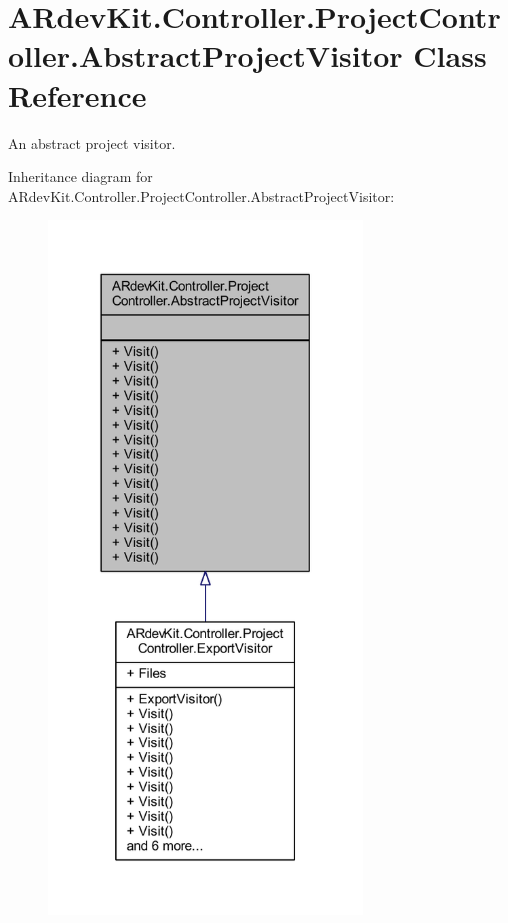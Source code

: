 \hypertarget{class_a_rdev_kit_1_1_controller_1_1_project_controller_1_1_abstract_project_visitor}{\section{A\-Rdev\-Kit.\-Controller.\-Project\-Controller.\-Abstract\-Project\-Visitor Class Reference}
\label{class_a_rdev_kit_1_1_controller_1_1_project_controller_1_1_abstract_project_visitor}
}


An abstract project visitor.  




Inheritance diagram for A\-Rdev\-Kit.\-Controller.\-Project\-Controller.\-Abstract\-Project\-Visitor\-:
\nopagebreak
\begin{figure}[H]
\begin{center}
\leavevmode
\includegraphics[width=236pt]{class_a_rdev_kit_1_1_controller_1_1_project_controller_1_1_abstract_project_visitor__inherit__graph}
\end{center}
\end{figure}



